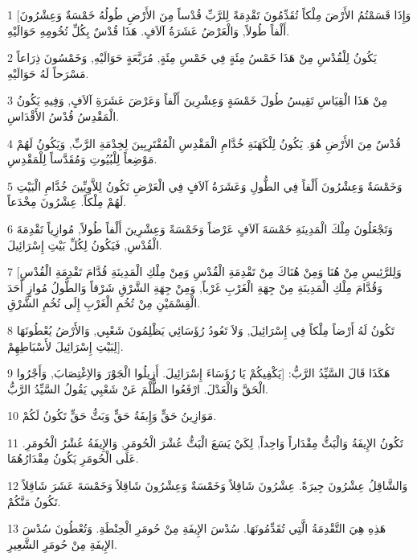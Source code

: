 \par 1 [وَإِذَا قَسَمْتُمُ الأَرْضَ مِلْكاً تُقَدِّمُونَ تَقْدِمَةً لِلرَّبِّ قُدْساً مِنَ الأَرْضِ طُولُهُ خَمْسَةٌ وَعِشْرُونَ أَلْفاً طُولاً, وَالْعَرْضُ عَشَرَةُ آلاَفٍ. هَذَا قُدْسٌ بِكُلِّ تُخُومِهِ حَوَالَيْهِ.
\par 2 يَكُونُ لِلْقُدْسِ مِنْ هَذَا خَمْسُ مِئَةٍ فِي خَمْسِ مِئَةٍ, مُرَبَّعَةٍ حَوَالَيْهِ, وَخَمْسُونَ ذِرَاعاً مَسْرَحاً لَهُ حَوَالَيْهِ.
\par 3 مِنْ هَذَا الْقِيَاسِ تَقِيسُ طُولَ خَمْسَةٍ وَعِشْرِينَ أَلْفاً وَعَرْضَ عَشَرَةِ آلاَفٍ, وَفِيهِ يَكُونُ الْمَقْدِسُ قُدْسُ الأَقْدَاسِ.
\par 4 قُدْسٌ مِنَ الأَرْضِ هُوَ. يَكُونُ لِلْكَهَنَةِ خُدَّامِ الْمَقْدِسِ الْمُقْتَرِبِينَ لِخِدْمَةِ الرَّبِّ, وَيَكُونُ لَهُمْ مَوْضِعاً لِلْبُيُوتِ وَمُقَدَّساً لِلْمَقْدِسِ.
\par 5 وَخَمْسَةٌ وَعِشْرُونَ أَلْفاً فِي الطُّولِ وَعَشَرَةُ آلاَفٍ فِي الْعَرْضِ تَكُونُ لِلاَّوِيِّينَ خُدَّامِ الْبَيْتِ لَهُمْ مِلْكاً. عِشْرُونَ مِخْدَعاً.
\par 6 وَتَجْعَلُونَ مِلْكَ الْمَدِينَةِ خَمْسَةَ آلاَفٍ عَرْضاً وَخَمْسَةً وَعِشْرِينَ أَلْفاً طُولاً, مُوازِياً تَقْدِمَةَ الْقُدْسِ, فَيَكُونُ لِكُلِّ بَيْتِ إِسْرَائِيلَ.
\par 7 [وَلِلرَّئِيسِ مِنْ هُنَا وَمِنْ هُنَاكَ مِنْ تَقْدِمَةِ الْقُدْسِ وَمِنْ مِلْكِ الْمَدِينَةِ قُدَّامَ تَقْدِمَةِ الْقُدْسِ وَقُدَّامَ مِلْكِ الْمَدِينَةِ مِنْ جِهَةِ الْغَرْبِ غَرْباً, وَمِنْ جِهَةِ الشَّرْقِ شَرْقاً وَالطُّولُ مُوازٍ أَحَدَ الْقِسْمَيْنِ مِنْ تُخُمِ الْغَرْبِ إِلَى تُخُمِ الشَّرْقِ.
\par 8 تَكُونُ لَهُ أَرْضاً مِلْكاً فِي إِسْرَائِيلَ, وَلاَ تَعُودُ رُؤَسَائِي يَظْلِمُونَ شَعْبِي, وَالأَرْضُ يُعْطُونَهَا لِبَيْتِ إِسْرَائِيلَ لأَسْبَاطِهِمْ].
\par 9 هَكَذَا قَالَ السَّيِّدُ الرَّبُّ: [يَكْفِيكُمْ يَا رُؤَسَاءَ إِسْرَائِيلَ. أَزِيلُوا الْجَوْرَ وَالاِغْتِصَابَ, وَأَجْرُوا الْحَقَّ وَالْعَدْلَ. ارْفَعُوا الظُّلْمَ عَنْ شَعْبِي يَقُولُ السَّيِّدُ الرَّبُّ.
\par 10 مَوَازِينُ حَقٍّ وَإِيفَةُ حَقٍّ وَبَثُّ حَقٍّ تَكُونُ لَكُمْ.
\par 11 تَكُونُ الإِيفَةُ وَالْبَثُّ مِقْدَاراً وَاحِداً, لِكَيْ يَسَعَ الْبَثُّ عُشْرَ الْحُومَرِ, وَالإِيفَةُ عُشْرُ الْحُومَرِ. عَلَى الْحُومَرِ يَكُونُ مِقْدَارُهُمَا.
\par 12 وَالشَّاقِلُ عِشْرُونَ جِيرَةً. عِشْرُونَ شَاقِلاً وَخَمْسَةٌ وَعِشْرُونَ شَاقِلاً وَخَمْسَةَ عَشَرَ شَاقِلاً تَكُونُ مَنَّكُمْ.
\par 13 هَذِهِ هِيَ التَّقْدِمَةُ الَّتِي تُقَدِّمُونَهَا. سُدْسَ الإِيفَةِ مِنْ حُومَرِ الْحِنْطَةِ. وَتُعْطُونَ سُدْسَ الإِيفَةِ مِنْ حُومَرِ الشَّعِيرِ.
